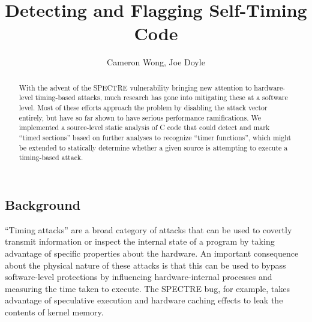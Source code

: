 \documentclass{article}
\title{Detecting and Flagging Self-Timing Code}
\author{Cameron Wong, Joe Doyle}
\begin{document}
\maketitle

\begin{abstract}
  With the advent of the SPECTRE vulnerability bringing new attention to
  hardware-level timing-based attacks, much research has gone into mitigating
  these at a software level. Most of these efforts approach the problem by
  disabling the attack vector entirely, but have so far shown to have serious
  performance ramifications. We implemented a source-level static analysis of
  C code that could detect and mark ``timed sections'' based on further
  analyses to recognize ``timer functions'', which might be extended to
  statically determine whether a given source is attempting to execute a
  timing-based attack.
\end{abstract}

\begin{multicols}{2}
  \section{Background}

  ``Timing attacks'' are a broad category of attacks that can be used to
  covertly transmit information or inspect the internal state of a program by
  taking advantage of specific properties about the hardware. An important
  consequence about the physical nature of these attacks is that this can be
  used to bypass software-level protections by influencing hardware-internal
  processes and measuring the time taken to execute. The SPECTRE bug, for
  example, takes advantage of speculative execution and hardware caching
  effects to leak the contents of kernel memory.
\end{multicols}
\end{document}
